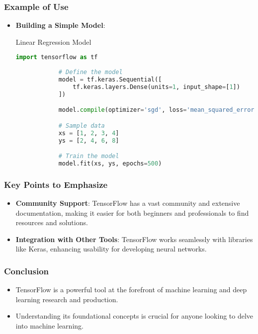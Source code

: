 \documentclass[aspectratio=169]{beamer}
\begin{document}
\begin{frame}[fragile]
    \frametitle{Example of Use}
    \begin{itemize}
        \item \textbf{Building a Simple Model}:
        \begin{block}{Linear Regression Model}
            \begin{lstlisting}[language=Python]
            import tensorflow as tf
            
            # Define the model
            model = tf.keras.Sequential([
                tf.keras.layers.Dense(units=1, input_shape=[1])
            ])

            model.compile(optimizer='sgd', loss='mean_squared_error')

            # Sample data
            xs = [1, 2, 3, 4]
            ys = [2, 4, 6, 8]

            # Train the model
            model.fit(xs, ys, epochs=500)
            \end{lstlisting}
            \end{block}
    \end{itemize}
\end{frame}

\begin{frame}[fragile]
    \frametitle{Key Points to Emphasize}
    \begin{itemize}
        \item \textbf{Community Support}: TensorFlow has a vast community and extensive documentation, making it easier for both beginners and professionals to find resources and solutions.
        \item \textbf{Integration with Other Tools}: TensorFlow works seamlessly with libraries like Keras, enhancing usability for developing neural networks.
    \end{itemize}
\end{frame}

\begin{frame}[fragile]
    \frametitle{Conclusion}
    \begin{itemize}
        \item TensorFlow is a powerful tool at the forefront of machine learning and deep learning research and production.
        \item Understanding its foundational concepts is crucial for anyone looking to delve into machine learning.
    \end{itemize}
\end{frame}
\end{document}
